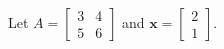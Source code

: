 \documentclass[preview]{standalone}
\begin{document}
\begin{center}
Let $A = \begin{bmatrix} 3 & 4 \\ 5 & 6 \end{bmatrix}$ and $\mathbf{x} = \begin{bmatrix} 2 \\ 1 \end{bmatrix}.$
\end{center}
\end{document}

